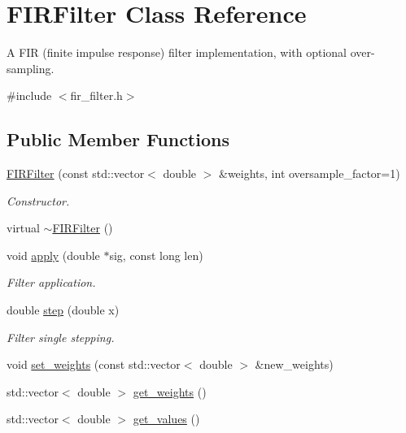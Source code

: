 \hypertarget{class_f_i_r_filter}{}\section{F\+I\+R\+Filter Class Reference}
\label{class_f_i_r_filter}


A F\+I\+R (finite impulse response) filter implementation, with optional over-\/sampling.  




{\ttfamily \#include $<$fir\+\_\+filter.\+h$>$}

\subsection*{Public Member Functions}
\begin{DoxyCompactItemize}
\item 
\hyperlink{class_f_i_r_filter_a74231f691b8cb9a51eb159d324891a06}{F\+I\+R\+Filter} (const std\+::vector$<$ double $>$ \&weights, int oversample\+\_\+factor=1)
\begin{DoxyCompactList}\small\item\em Constructor. \end{DoxyCompactList}\item 
virtual \hyperlink{class_f_i_r_filter_a00e4c24c3e9ee081cf69f5e7b38b743e}{$\sim$\+F\+I\+R\+Filter} ()
\item 
void \hyperlink{class_f_i_r_filter_a5f79d32e1ebec3ffc79f623fb4cd4061}{apply} (double $\ast$sig, const long len)
\begin{DoxyCompactList}\small\item\em Filter application. \end{DoxyCompactList}\item 
double \hyperlink{class_f_i_r_filter_a8c04ad8d144f3edbe769ae069cb54ecc}{step} (double x)
\begin{DoxyCompactList}\small\item\em Filter single stepping. \end{DoxyCompactList}\item 
void \hyperlink{class_f_i_r_filter_afa7d746246050f6af4e8958d46763a9f}{set\+\_\+weights} (const std\+::vector$<$ double $>$ \&new\+\_\+weights)
\item 
std\+::vector$<$ double $>$ \hyperlink{class_f_i_r_filter_ab15b9d936df370fbb4d3d3e84f08c27d}{get\+\_\+weights} ()
\item 
std\+::vector$<$ double $>$ \hyperlink{class_f_i_r_filter_ab3e87fa9bb550d3eb109227b8345a4ee}{get\+\_\+values} ()
\end{DoxyCompactItemize}
